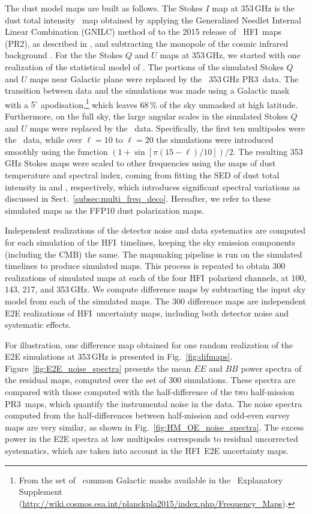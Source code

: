 \documentclass[longauth,traditabstract]{aa}
\newcommand{\HFI}{HFI}
\newcommand{\PR}{PR3}
\begin{document}
The dust model maps are built as follows. 
The Stokes $I$ map at 353\,GHz is the dust total intensity \Planck\ map obtained by applying the Generalized Needlet Internal Linear Combination (GNILC) method of \citet{Remazeilles11} to the 2015 release of \Planck\ 
\HFI\ maps (PR2), as described in \citet{planck2016-XLVIII}, and subtracting the monopole of the cosmic infrared background \citep{planck2014-a09}.
For the the Stokes $Q$ and $U$ maps at 353\,GHz, we started with one realization of the statistical model of \citet{Vansyngel16}.
The portions of the simulated Stokes $Q$ and $U$ maps near Galactic plane were replaced by the \Planck\ 353\,GHz \PR\ data. The transition between data and the simulations was made using a Galactic mask with a 
$5^\circ$ apodisation,\footnote{From the set of \Planck\ common Galactic masks available in the \Planck\ Explanatory Supplement (\url{http://wiki.cosmos.esa.int/planckpla2015/index.php/Frequency\_Maps}).} which leaves 68\,\% of the sky unmasked at high latitude.  Furthermore, on the full sky, the large angular scales in the simulated Stokes $Q$ and $U$ maps were replaced by the \Planck\ data. 
Specifically, the first ten multipoles were the \Planck\ data, while over $\ell=10$ to $\ell=20$ the simulations were introduced smoothly using the function $\left(1+\sin\left[\pi\left(15-\ell\right)/10\right]\right)/2$. 
The resulting 353\,GHz Stokes maps were scaled to other frequencies using the maps of dust temperature and spectral index, coming from fitting
the SED of dust total intensity in \citet{planck2016-XLVIII} and \citet{planck2013-p06b}, respectively, which introduces significant spectral variations as discussed in Sect.~\ref{subsec:multi_freq_deco}.
Hereafter, we refer to these simulated maps as the FFP10 dust polarization maps.

Independent realizations of the detector noise and data systematics are computed for each simulation of the \HFI\ timelines, 
keeping the sky emission components (including the CMB) the same.  The mapmaking pipeline is run on the simulated timelines to produce simulated maps. This process is repeated to obtain
300 realizations of simulated maps at each of the four \HFI\ polarized channels, at 100, 143, 217, and 353$\,$GHz.
We compute difference maps by subtracting the input sky model from each of the simulated maps.
The 300 difference maps are independent E2E realizations of \HFI\ uncertainty maps, including both detector noise and systematic effects. 

For illustration, one difference map obtained for one random realization of the E2E simulations at 353$\,$GHz is presented in Fig.~\ref{fig:difmaps}.
Figure~\ref{fig:E2E_noise_spectra} presents the mean $EE$ and $BB$ power spectra of the residual maps, computed over the set of 300 simulations. 
These spectra are compared with those computed with the half-difference of the two half-mission \PR\ maps, which quantify the instrumental noise in the data. 
The noise spectra computed from the half-differences between half-mission and odd-even survey maps are very similar, as shown in Fig.~\ref{fig:HM_OE_noise_spectra}. 
The excess power in the E2E spectra at low multipoles corresponds to residual uncorrected systematics, which are taken into account in the \HFI\ E2E uncertainty maps.
\end{document}
